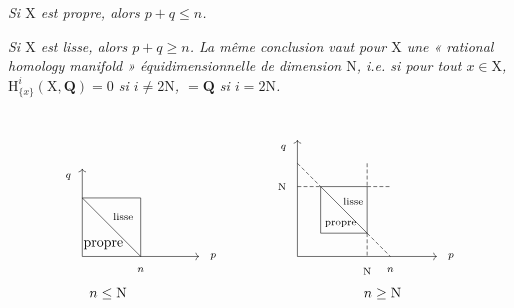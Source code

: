 \documentclass[11pt,leqno]{article}
\newcommand{\Page}[1]{\ifvmode\noindent\else\unskip\ \fi{\footnotesize\textcolor{gray}{[p.\,#1]}}\ \ignorespaces}
\begin{document}
\noindent\hspace*{\parindent}
\textit{Si \(\mathrm{X}\) est propre, alors \(p+q\leq n\).}

\noindent\hspace*{\parindent}
\textit{Si \(\mathrm{X}\) est lisse, alors \(p+q\geq n\). La même conclusion vaut pour \(\mathrm{X}\) une « rational homology manifold » équidimensionnelle de dimension \(\mathrm{N}\), \textup{i.e.} si pour tout \(x\in\mathrm{X}\), \(\mathrm{H}^i_{\{x\}}(\mathrm{X},\mathbf{Q})=0\) si \(i\neq2\mathrm{N}\), \(=\mathbf{Q}\) si \(i=2\mathrm{N}\).}

\Page{39}
\[
\begin{tikzcd}[
  baseline=(current bounding box.south),
  row sep=7mm,column sep=7mm,
  cells={nodes={inner sep=0pt,outer sep=0pt,text height=0pt,text depth=0pt}},
  arrows={start anchor=center,end anchor=center}
]
{} & {} & {} & {} & {}\\
{} \arrow[rr,no head,"\text{lisse}"'{pos=.7,yshift=-3mm}]
   \arrow[ddrr,no head]
 & {}
 & {} \arrow[dd,no head,"n"{pos=1,anchor=north,yshift=-2mm}]
 & {} & {}\\
{} & {} & {} & {} & {}\\
{} \arrow[uuu,"q"{pos=1,anchor=east,xshift=-2mm,yshift=-2mm}]
   \arrow[rrrr,"p"{pos=1,anchor=west,xshift=2mm}]
   \arrow[rrrr,phantom,"\text{propre}"{pos=.18,anchor=south,yshift=1mm}]
   \arrow[rrrr,phantom,"n\leq\mathrm{N}"'{pos=.22,anchor=north,yshift=-7mm}]
 & {} & {} & {} & {}
\end{tikzcd}
\qquad\qquad
\begin{tikzcd}[
  baseline=(current bounding box.south),
  row sep=5.5mm,column sep=5.5mm,
  cells={nodes={inner sep=0pt,outer sep=0pt,text height=0pt,text depth=0pt}},
  arrows={start anchor=center,end anchor=center}
]
{} & {} & {} & {} & {} & {} & {}\\
{} \arrow[dr,dashed,no head]
 & {} & {}
 & {} \arrow[d,dashed,no head]
 & {} & {} & {}\\
{} \arrow[r,dashed,no head,"\mathrm{N}"{pos=0,anchor=east,xshift=-2mm}]
 & {} \arrow[rr,no head,"\text{lisse}"'{pos=.7,yshift=-2mm}]
      \arrow[dd,no head]
      \arrow[ddrr,no head]
 & {}
 & {} \arrow[r,dashed,no head] \arrow[dd,no head]
 & {} & {} & {}\\
{} & {} & {} & {} & {} & {} & {}\\
{} & {} \arrow[rr,no head,"\text{propre}"{pos=.43,anchor=south,yshift=.7mm}]
 & {}
 & {} \arrow[dr,dashed,no head,"n"{pos=1,anchor=north,yshift=-2mm}]
      \arrow[d,dashed,no head,"\mathrm{N}"{pos=1,anchor=north,yshift=-2mm}]
 & {} & {} & {}\\
{} \arrow[uuuuu,"q"{pos=1,anchor=east,xshift=-2mm,yshift=-2mm}]
   \arrow[rrrrrr,"p"{pos=1,anchor=west,xshift=2mm}]
   \arrow[rrrrrr,phantom,"n\geq\mathrm{N}"'{pos=.61,anchor=north,yshift=-7mm}]
 & {} & {} & {} & {} & {} & {}
\end{tikzcd}
\]
\end{document}
